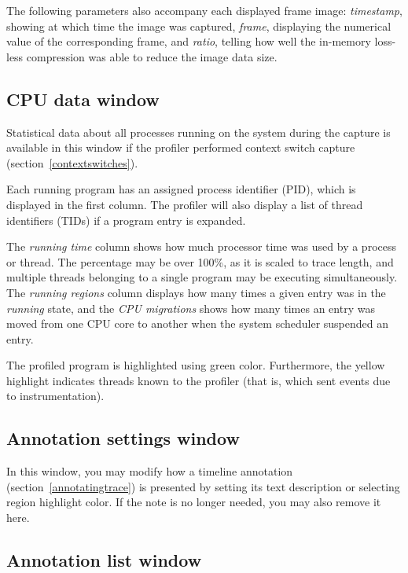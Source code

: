 \documentclass[hidelinks,titlepage,a4paper]{article}
\begin{document}
The following parameters also accompany each displayed frame image: \emph{timestamp}, showing at which time the image was captured, \emph{frame}, displaying the numerical value of the corresponding frame, and \emph{ratio}, telling how well the in-memory loss-less compression was able to reduce the image data size.

\subsection{CPU data window}
\label{cpudata}

Statistical data about all processes running on the system during the capture is available in this window if the profiler performed context switch capture (section~\ref{contextswitches}).

Each running program has an assigned process identifier (PID), which is displayed in the first column. The profiler will also display a list of thread identifiers (TIDs) if a program entry is expanded.

The \emph{running time} column shows how much processor time was used by a process or thread. The percentage may be over 100\%, as it is scaled to trace length, and multiple threads belonging to a single program may be executing simultaneously. The \emph{running regions} column displays how many times a given entry was in the \emph{running} state, and the \emph{CPU migrations} shows how many times an entry was moved from one CPU core to another when the system scheduler suspended an entry.

The profiled program is highlighted using green color. Furthermore, the yellow highlight indicates threads known to the profiler (that is, which sent events due to instrumentation).

\subsection{Annotation settings window}
\label{annotationsettings}

In this window, you may modify how a timeline annotation (section~\ref{annotatingtrace}) is presented by setting its text description or selecting region highlight color. If the note is no longer needed, you may also remove it here.

\subsection{Annotation list window}
\label{annotationlist}
\end{document}
